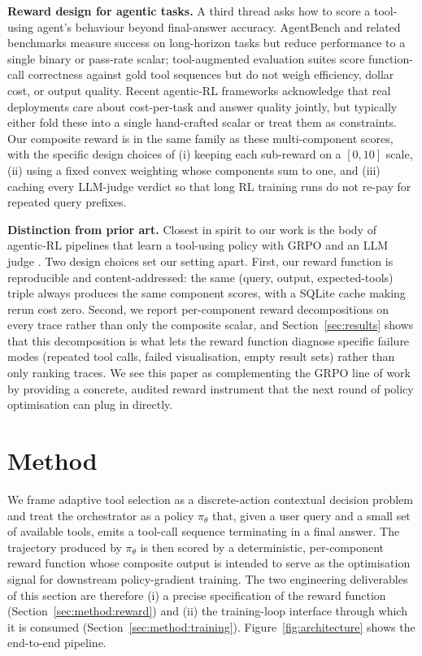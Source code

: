 \documentclass[10pt,twocolumn]{article}
\begin{document}
\textbf{Reward design for agentic tasks.} A third thread asks how to score a tool-using agent's behaviour beyond final-answer accuracy. AgentBench and related benchmarks \cite{liu2024agentbench, mialon2024gaia} measure success on long-horizon tasks but reduce performance to a single binary or pass-rate scalar; tool-augmented evaluation suites \cite{qin2023toolllm, patil2023gorilla, schick2023toolformer} score function-call correctness against gold tool sequences but do not weigh efficiency, dollar cost, or output quality. Recent agentic-RL frameworks \cite{wang2024surveyllmagents, yao2024taubench} acknowledge that real deployments care about cost-per-task and answer quality jointly, but typically either fold these into a single hand-crafted scalar or treat them as constraints. Our composite reward is in the same family as these multi-component scores, with the specific design choices of (i) keeping each sub-reward on a $[0, 10]$ scale, (ii) using a fixed convex weighting whose components sum to one, and (iii) caching every LLM-judge verdict so that long RL training runs do not re-pay for repeated query prefixes.

\textbf{Distinction from prior art.} Closest in spirit to our work is the body of agentic-RL pipelines that learn a tool-using policy with GRPO and an LLM judge \cite{shao2024deepseekmath, jin2025searchr1, sun2025zerosearch, deepseek2025r1}. Two design choices set our setting apart. First, our reward function is reproducible and content-addressed: the same (query, output, expected-tools) triple always produces the same component scores, with a SQLite cache making rerun cost zero. Second, we report per-component reward decompositions on every trace rather than only the composite scalar, and Section~\ref{sec:results} shows that this decomposition is what lets the reward function diagnose specific failure modes (repeated tool calls, failed visualisation, empty result sets) rather than only ranking traces. We see this paper as complementing the GRPO line of work by providing a concrete, audited reward instrument that the next round of policy optimisation can plug in directly.


\section{Method}
\label{sec:method}

We frame adaptive tool selection as a discrete-action contextual decision problem and treat the orchestrator as a policy $\pi_\theta$ that, given a user query and a small set of available tools, emits a tool-call sequence terminating in a final answer. The trajectory produced by $\pi_\theta$ is then scored by a deterministic, per-component reward function whose composite output is intended to serve as the optimisation signal for downstream policy-gradient training. The two engineering deliverables of this section are therefore (i) a precise specification of the reward function (Section~\ref{sec:method:reward}) and (ii) the training-loop interface through which it is consumed (Section~\ref{sec:method:training}). Figure~\ref{fig:architecture} shows the end-to-end pipeline.
\end{document}
